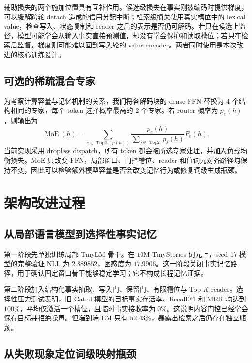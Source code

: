 \documentclass[letterpaper]{article}
\begin{document}
辅助损失的两个施加位置具有互补作用。候选级损失在事实刚被编码时提供梯度，可以缓解跨轮 detach 造成的信用分配中断；检索级损失使用真实槽位中的 lexical value，检查写入、状态复制和 reader 之后的表示是否仍可解码。若只在候选上监督，模型可能学会从输入事实直接预测值，却没有学会保护和读取槽位；若只在检索后监督，梯度则可能难以回到写入轮的 value encoder。两者同时使用是本次改进的核心训练设计。

\subsection{可选的稀疏混合专家}

为考察计算容量与记忆机制的关系，我们将各解码块的 dense FFN 替换为 $4$ 个结构相同的专家，每个 token 选择概率最高的 $2$ 个专家。若 router 概率为 $p_e(h)$，则输出为
\begin{equation}
\operatorname{MoE}(h)=\sum_{e\in\operatorname{Top2}(p(h))}
\frac{p_e(h)}{\sum_{j\in\operatorname{Top2}}p_j(h)}F_e(h).
\end{equation}
当前实现采用 dropless dispatch，所有 token 都会被所选专家处理，并加入负载均衡损失。MoE 只改变 FFN，局部窗口、门控槽位、reader 和值词元对齐路径均保持不变，因此可以检验额外模型容量是否会改变记忆行为或修复词级生成瓶颈。

\section{架构改进过程}

\subsection{从局部语言模型到选择性事实记忆}

第一阶段先单独训练局部 TinyLM 骨干。在 $10$M TinyStories 词元上，seed 17 模型的完整验证 NLL 为 $2.889852$，困惑度为 $17.9906$。这一阶段关闭事实记忆路径，用于确认固定窗口骨干能够稳定学习；它不构成长程记忆证据。

第二阶段加入结构化事实抽取、写入门、保留门、有限槽位与 Top-$K$ reader。选择性压力测试表明，旧 Gated 模型的目标事实存活率、Recall@1 和 MRR 均达到 $100\%$，平均仅激活一个槽位，且临时事实接收率为 $0\%$。这说明内容门控已经学会保存目标并拒绝噪声。但端到端 EM 只有 $52.43\%$，暴露出检索之后仍存在独立瓶颈。

\subsection{从失败现象定位词级映射瓶颈}
\end{document}
